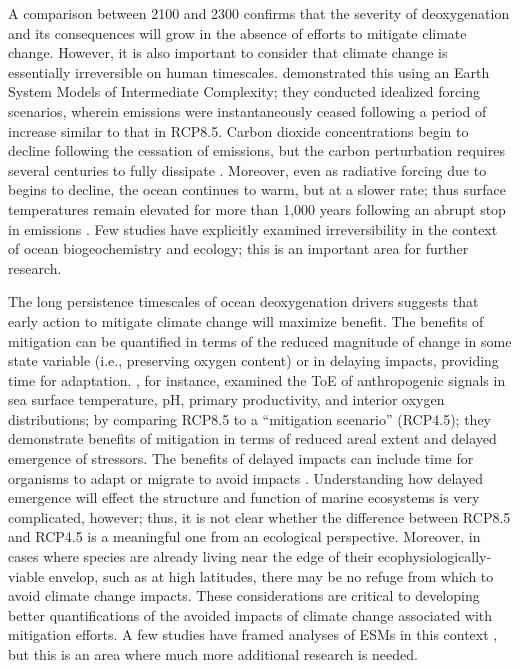 \documentclass[draft,linenumbers]{report_chapter}
\begin{document}
A comparison between 2100 and 2300 confirms that the severity of deoxygenation and its consequences will grow in the absence of efforts to mitigate climate change.
However, it is also important to consider that climate change is essentially irreversible on human timescales.
\citet{Solomon-Plattner-etal-2009} demonstrated this using an Earth System Models of Intermediate Complexity; they conducted idealized forcing scenarios, wherein emissions were instantaneously ceased following a period of increase similar to that in RCP8.5.
Carbon dioxide concentrations begin to decline following the cessation of emissions, but the carbon perturbation requires several centuries to fully dissipate \citep{Archer-Kheshgi-etal-1997,Archer-Brovkin-2008}.
Moreover, even as radiative forcing due to  begins to decline, the ocean continues to warm, but at a slower rate; thus surface temperatures remain elevated for more than 1,000 years following an abrupt stop in emissions \citep{Solomon-Plattner-etal-2009}.
Few studies have explicitly examined irreversibility in the context of ocean biogeochemistry and ecology; this is an important area for further research.

The long persistence timescales of ocean deoxygenation drivers suggests that early action to mitigate climate change will maximize benefit.
The benefits of mitigation can be quantified in terms of the reduced magnitude of change in some state variable (i.e., preserving oxygen content) or in  delaying impacts, providing time for adaptation.
\citet{Henson-Beaulieu-etal-2017}, for instance, examined the ToE of anthropogenic signals in sea surface temperature, pH, primary productivity, and interior oxygen distributions; by comparing RCP8.5 to a ``mitigation scenario'' (RCP4.5); they demonstrate benefits of mitigation in terms of reduced areal extent and delayed emergence of stressors.
The benefits of delayed impacts can include time for organisms to adapt or migrate to avoid impacts \citep{Henson-Beaulieu-etal-2017}.
Understanding how delayed emergence will effect the structure and function of marine ecosystems is very complicated, however; thus, it is not clear whether the difference between RCP8.5 and RCP4.5 is a meaningful one from an ecological perspective.
Moreover, in cases where species are already living near the edge of their ecophysiologically-viable envelop, such as at high latitudes, there may be no refuge from which to avoid climate change impacts.
These considerations are critical to developing better quantifications of the avoided impacts of climate change associated with mitigation efforts.
A few studies have framed analyses of ESMs in this context \citep[e.g.,][]{Krumhardt-Lovenduski-etal-2016}, but this is an area where much more additional research is needed.
\end{document}
